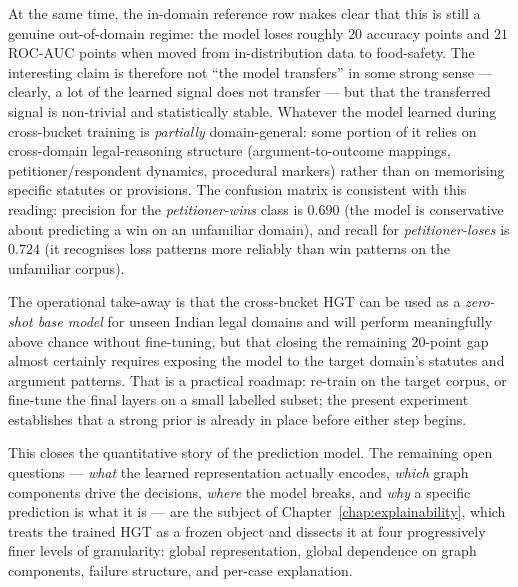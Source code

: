 At the same time, the in-domain reference row makes clear that this
is still a genuine out-of-domain regime: the model loses roughly
$20$ accuracy points and $21$ ROC-AUC points when moved from
in-distribution data to food-safety.  The interesting claim is
therefore not ``the model transfers'' in some strong sense ---
clearly, a lot of the learned signal does not transfer --- but that
the transferred signal is non-trivial and statistically stable.
Whatever the model learned during cross-bucket training is
\emph{partially} domain-general: some portion of it relies on
cross-domain legal-reasoning structure (argument-to-outcome
mappings, petitioner/respondent dynamics, procedural markers)
rather than on memorising specific statutes or provisions.  The
confusion matrix is consistent with this reading: precision for the
\emph{petitioner-wins} class is $0.690$ (the model is conservative
about predicting a win on an unfamiliar domain), and recall for
\emph{petitioner-loses} is $0.724$ (it recognises loss patterns
more reliably than win patterns on the unfamiliar corpus).

The operational take-away is that the cross-bucket HGT can be used
as a \emph{zero-shot base model} for unseen Indian legal domains and
will perform meaningfully above chance without fine-tuning, but
that closing the remaining $20$-point gap almost certainly requires
exposing the model to the target domain's statutes and argument
patterns.  That is a practical roadmap: re-train on the target
corpus, or fine-tune the final layers on a small labelled subset;
the present experiment establishes that a strong prior is already in
place before either step begins.

\vspace{0.5em}

This closes the quantitative story of the prediction model. The
remaining open questions --- \emph{what} the learned representation
actually encodes, \emph{which} graph components drive the decisions,
\emph{where} the model breaks, and \emph{why} a specific prediction
is what it is --- are the subject of
Chapter~\ref{chap:explainability}, which treats the trained HGT as a
frozen object and dissects it at four progressively finer levels of
granularity: global representation, global dependence on graph
components, failure structure, and per-case explanation.

\endinput


\section{Probing Classifier Analysis}

